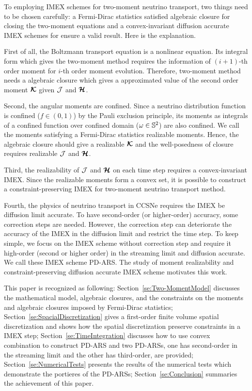  \cite{vartanyan_etal_2018,oConnorCouch_2018,pan_etal_2018,cabezon_etal_2018,glas_etal_2018,just_etal_2018,kuroda_etal_2016}

To employing IMEX schemes for two-moment neutrino transport, two things need to be chosen carefully: a Fermi-Dirac statistics satisfied algebraic closure for closing the two-moment equations and a convex-invariant diffusion accurate IMEX schemes for ensure a valid result.
Here is the explanation.

First of all, the Boltzmann transport equation is a nonlinear equation.
Its integral form which gives the two-moment method requires the information of $(i+1)$-th order moment for $i$-th order moment evolution.
Therefore, two-moment method needs a algebraic closure which gives a approximated value of the second order moment $\boldsymbol{\mathcal{K}}$ given $\mathcal{J}$ and $\boldsymbol{\mathcal{H}}$.

Second, the angular moments are confined.
Since a neutrino distribution function is confined ($f\in(0,1)$) by the Pauli exclusion principle, its moments as integrals of a confined function over confined domain ($\omega\in\mathbb{S}^{2}$) are also confined.
We call the moments satisfying a Fermi-Dirac statistics realizable moments.
Hence, the algebraic closure should give a realizable $\boldsymbol{\mathcal{K}}$ and the well-posedness of closure requires realizable $\mathcal{J}$ and $\boldsymbol{\mathcal{H}}$.

Third, the realizability of $\mathcal{J}$ and $\boldsymbol{\mathcal{H}}$ on each time step requires a convex-invariant IMEX.
Since the realizable moments form a convex set, it is possible to construct a constraint-preserving IMEX for two-moment neutrino transport method.

Fourth, the physics of neutrino transport in CCSNe requires the IMEX be diffusion limit accurate.
To have second-order (or higher-order) accuracy, some correction steps are needed.
However, the correction step can deteriorate the accuracy of the IMEX in the diffusion limit and restrict the time step.
To keep simple, we focus on the IMEX scheme without correction step and require it high-order (second or higher order) in the streaming limit and diffusion accurate.
We call these IMEX scheme PD-ARS.
The study of moment realizability and constraint-preserving diffusion accurate IMEX scheme motivates this work.

This paper is recognized as following: Section~\ref{se:Two-MomentModel} discusses the mathematical model, algebraic closures, and the constraints on the moments and algebraic closures imposed by Fermi-Dirac statistics;
Section~\ref{se:SpacialDiscretization} gives a first-order finite volume spatial discretization and shows how the spatial discretization preserve constraints in a IMEX step;
Section~\ref{se:TimeIntegration} discusses how to use convex combination to construct PD-ARS and two PD-ARSs, one has second-order in the streaming limit and the other has third-order, are provided;
Section~\ref{se:NumericalTests} presents the results of the numerical tests which demonstrate the portieres of the PD-ARSs; Section~\ref{se:Conclusion} summaries the achievement of this paper.